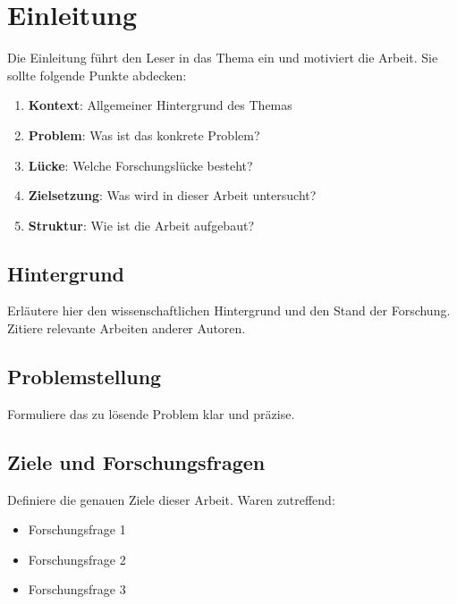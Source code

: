 
\chapter{Einleitung}
\label{chap:introduction}

Die Einleitung führt den Leser in das Thema ein und motiviert die Arbeit.
Sie sollte folgende Punkte abdecken:

\begin{enumerate}
    \item \textbf{Kontext}: Allgemeiner Hintergrund des Themas
    \item \textbf{Problem}: Was ist das konkrete Problem?
    \item \textbf{Lücke}: Welche Forschungslücke besteht?
    \item \textbf{Zielsetzung}: Was wird in dieser Arbeit untersucht?
    \item \textbf{Struktur}: Wie ist die Arbeit aufgebaut?
\end{enumerate}

\section{Hintergrund}
\label{sec:intro:background}

Erläutere hier den wissenschaftlichen Hintergrund und den Stand der Forschung.
Zitiere relevante Arbeiten anderer Autoren.

\section{Problemstellung}
\label{sec:intro:problem}

Formuliere das zu lösende Problem klar und präzise.

\section{Ziele und Forschungsfragen}
\label{sec:intro:objectives}

Definiere die genauen Ziele dieser Arbeit. Waren zutreffend:
\begin{itemize}
    \item Forschungsfrage 1
    \item Forschungsfrage 2
    \item Forschungsfrage 3
\end{itemize}

